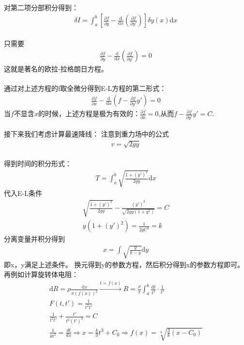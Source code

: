 \documentclass[12pt,a4paper,UTF8]{ctexbook}
\theoremstyle{plain}
\begin{document}
\paragraph{}对第二项分部积分得到：
\begin{align*}
    \delta I = \int_a^b [\frac{\partial f}{\partial y}-\frac{\mathrm d }{\mathrm d x}(\frac{\partial f}{\partial y'})]\delta y(x) \mathrm d x
\end{align*}
\paragraph{}只需要
\begin{align*}
    \frac{\partial f}{\partial y}-\frac{\mathrm d }{\mathrm d x}(\frac{\partial f}{\partial y'}) = 0
\end{align*}
这就是著名的欧拉-拉格朗日方程。
\paragraph{}
通过对上述方程的f取全微分得到E-L方程的第二形式：
\begin{align*}
    \frac{\partial f}{\partial x}-\frac{\mathrm d }{\mathrm d x}(f-\frac{\partial f}{\partial y'}y') = 0
\end{align*}
当$f$不显含$x$的时候，上述方程是极为有效的：$\frac{\partial f}{\partial x}=0$,从而$f-\frac{\partial f}{\partial y'}y'=C$.
\paragraph{}接下来我们考虑计算最速降线：
注意到重力场中的公式
\begin{align*}
    v=\sqrt{2gy}
\end{align*}
\paragraph{}得到时间的积分形式：
\begin{align*}
    T=\int_a^b \sqrt{\frac{1+(y')^2}{2gy}}\mathrm d x
\end{align*}
代入E-L条件
\begin{align*}
    \sqrt{\frac{1+(y')^2}{2gy}}-\frac{(y')^2}{\sqrt{2gy(1+y^2)}}=C\\
    y(1+(y')^2)=\frac{1}{2gC^2}=k
\end{align*}
分离变量并积分得到
\begin{align*}
    x=\int \sqrt{\frac{y}{k-y}}\mathrm d y
\end{align*}
即x，y满足上述条件。
换元得到y的参数方程，然后积分得到x的参数方程即可。
再例如计算旋转体电阻：
\begin{align*}
    &\mathrm d R= \rho\frac{\mathrm d x}{\pi (f(x))^2}\overset{t=f(x)}{\rightarrow} R=\frac{\rho}{\pi}\int_{a}^b\frac{\mathrm d t}{t^2}\cdot\frac{1}{t'}&\\
    &F(t,t')=\frac{1}{t^2t'}&\\
    &\frac{1}{t^2 t'}+\frac{t'}{t^2(t')^2}=C&\\
    &\frac{1}{kt^2}=\frac{dt}{dx}\Rightarrow x=\frac{k}{3}t^3+C_0\Rightarrow f(x)=\sqrt[3]{\frac{3}{k}(x-C_0)}&
\end{align*}
\end{document}
